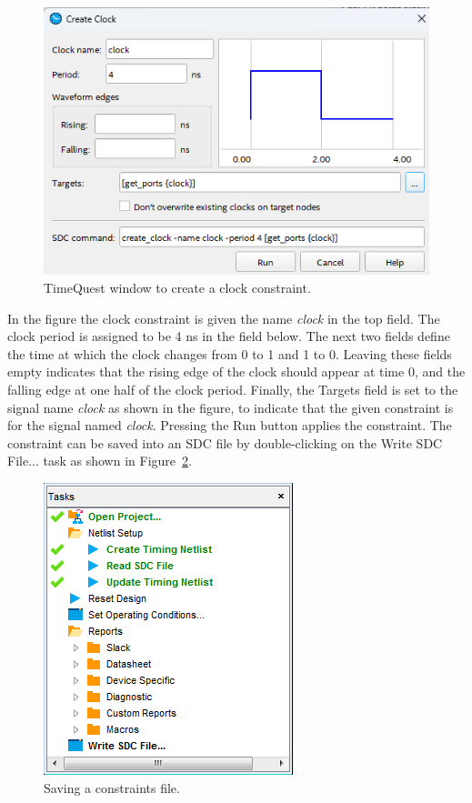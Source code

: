 \documentclass[11pt, twoside, pdftex]{article}
\begin{document}
\begin{figure}[H]
\begin{center}
\includegraphics[scale=0.65]{figures/figure12.png}
\end{center}
\caption{TimeQuest window to create a clock constraint.}
\label{fig:12}
\end{figure}

In the figure the clock constraint is given the name {\it clock} in the top field. The
clock period is assigned to be 4 ns in the field below. The next two fields define the time
at which the clock changes from 0 to 1 and 1 to 0. Leaving these fields empty indicates that 
the rising edge of the clock should appear at time 0, and the falling edge at one half of 
the clock period. Finally, the {\sf Targets} field is set to the signal name {\it clock} as 
shown in the figure, to indicate that the given constraint is for the signal named {\it clock}. 
Pressing the {\sf Run} button applies the constraint. The constraint can be saved into an SDC file by double-clicking on the {\sf Write SDC File...} task as 
shown in Figure~\ref{fig:13}.

\begin{figure}[H]
\begin{center}
\includegraphics[scale=0.6]{figures/figure13.png}
\end{center}
\caption{Saving a constraints file.}
\label{fig:13}
\end{figure}
\end{document}
